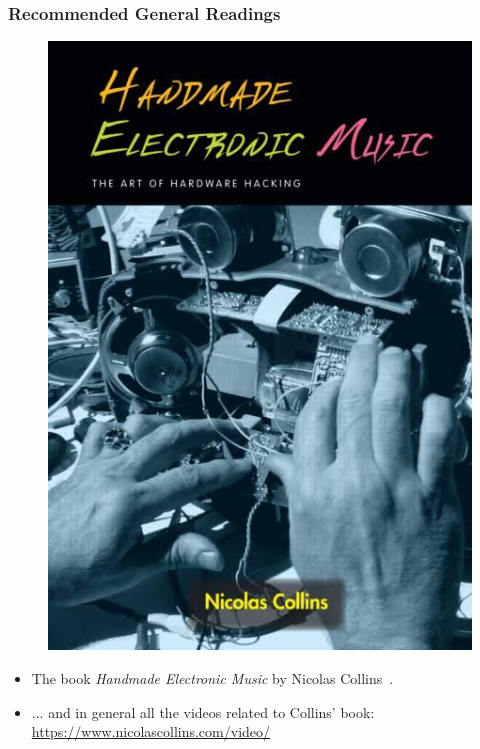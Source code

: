 \documentclass[screen, aspectratio=169]{beamer}
\begin{document}
%
\begin{frame}
\frametitle{Recommended General Readings}
\begin{figure}
\includegraphics[scale=0.2]{img/HEM-collins-book.jpg}
\end{figure}
\begin{itemize}
\item The book \emph{Handmade Electronic Music} by Nicolas Collins~\cite{Collins.2006.handmadebook}.
\item ... and in general all the videos related to Collins' book:\\
\url{https://www.nicolascollins.com/video/}
\end{itemize}
\end{frame}
%
\end{document}
